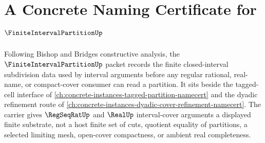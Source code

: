 \chapter{A Concrete Naming Certificate for $\FiniteIntervalPartitionUp$}
\label{ch:concrete-instances-finite-interval-partition-namecert}

Following Bishop and Bridges constructive analysis, the $\FiniteIntervalPartitionUp$ packet records the finite closed-interval subdivision data used by interval arguments before any regular rational, real-name, or compact-cover consumer can read a partition. It sits beside the tagged-cell interface of \autoref{ch:concrete-instances-tagged-partition-namecert} and the dyadic refinement route of \autoref{ch:concrete-instances-dyadic-cover-refinement-namecert}. The carrier gives $\RegSeqRatUp$ and $\RealUp$ interval-cover arguments a displayed finite substrate, not a host finite set of cuts, quotient equality of partitions, a selected limiting mesh, open-cover compactness, or ambient real completeness.

